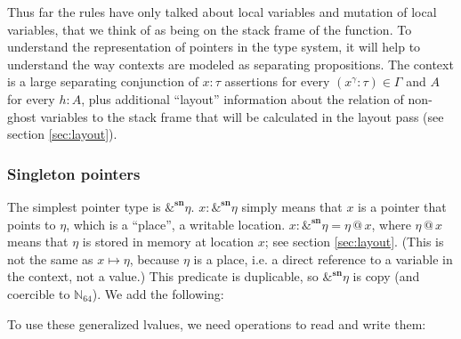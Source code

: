 \documentclass[acmsmall,nonacm]{acmart}
\newcommand*{\N}{\mathbb{N}}
\newcommand{\proves}{\vdash}
\newcommand{\makes}{\dashv}
\begin{document}
Thus far the rules have only talked about local variables and mutation of local variables, that we think of as being on the stack frame of the function. To understand the representation of pointers in the type system, it will help to understand the way contexts are modeled as separating propositions. The context is a large separating conjunction of $\boxed{x:\tau}$ assertions for every $(x^\gamma:\tau)\in\Gamma$ and $A$ for every $h:A$, plus additional ``layout'' information about the relation of non-ghost variables to the stack frame that will be calculated in the layout pass (see section \ref{sec:layout}).

\subsubsection{Singleton pointers}

The simplest pointer type is $\&^\mathbf{sn}\eta$. $x:\&^\mathbf{sn}\eta$ simply means that $x$ is a pointer that points to $\eta$, which is a ``place'', a writable location. $\boxed{x:\&^\mathbf{sn}\eta}=\eta\mathrel{@}x$, where $\eta\mathrel{@}x$ means that $\eta$ is stored in memory at location $x$; see section \ref{sec:layout}. (This is not the same as $x\mapsto\eta$, because $\eta$ is a place, i.e. a direct reference to a variable in the context, not a value.) This predicate is duplicable, so $\&^\mathbf{sn}\eta$ is \textsf{copy} (and coercible to $\N_{64}$). We add the following:

To use these generalized lvalues, we need operations to read and write them:

\end{document}
